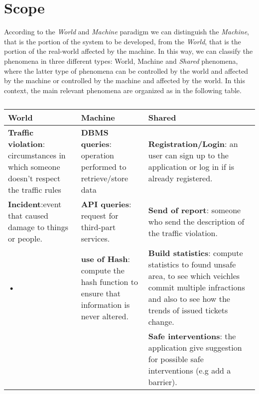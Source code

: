 \documentclass{report}
\begin{document}
\section{Scope}
According to the \textit{World} and \textit{Machine} paradigm we can distinguish the \textit{Machine}, that is the portion of the system to be developed, from the \textit{World}, that is the portion of the real-world affected by the machine. In this way, we can classify the phenomena in three different types: World, Machine and \textit{Shared} phenomena, where the latter type of phenomena can be controlled by the world and affected by the machine or controlled by the machine and affected by the world.
\newline
In this context, the main relevant phenomena are organized as in the following table.
\begin{table}[h!]
		\begin{center}
			\begin{tabular}{|C{3.5cm}|C{3.5cm}|C{3.5cm}|}
				\toprule
				\textbf{World} &\textbf{Machine}& \textbf{Shared}\\
				\midrule
				\textbf{Traffic violation}: circumstances in which someone doesn't respect the traffic rules&\textbf{DBMS queries}: operation performed to retrieve/store data&\textbf{Registration/Login}: an user can sign up to the application or log in if is already registered.\\
				\midrule
				\textbf{Incident}:event that caused damage to things or people.&\textbf{API queries}: request for third-part services.&\textbf{Send of report}: someone who send the description of the traffic violation.\\
				\midrule
				\textbf{•}&\textbf{use of Hash}: compute the hash function to ensure that information is never altered. &\textbf{Build statistics}: compute statistics to found unsafe area, to see which veichles commit multiple infractions and also to see how the trends of issued tickets change.\\
				\midrule
				&&\textbf{Safe interventions}: the application give suggestion for possible safe interventions (e.g add a barrier). \\ 
			\end{tabular}
		\end{center}
		\caption{}
		\label{tab:multicol}
	\end{table}
\end{document}
